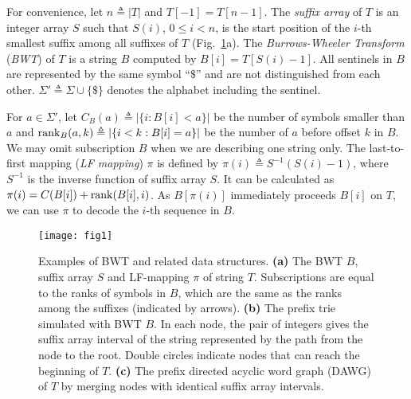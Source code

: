 \documentclass[webpdf,contemporary,large,namedate]{oup-authoring-template}%
\begin{document}
For convenience, let $n\triangleq|T|$ and $T[-1]=T[n-1]$.
The \emph{suffix array} of $T$ is an integer array $S$ such that $S(i)$,
$0\le i<n$, is the start position of the $i$-th smallest suffix among all suffixes of $T$ (Fig.~\ref{fig:1}a).
The \emph{Burrows-Wheeler Transform} (\emph{BWT}) of $T$ is a string $B$ computed by $B[i]=T[S(i)-1]$.
All sentinels in $B$ are represented by the same symbol ``$\$$'' and are not distinguished from each other.
$\Sigma'\triangleq\Sigma\cup\{\$\}$ denotes the alphabet including the sentinel.

For $a\in\Sigma'$, let $C_B(a)\triangleq|\{i:B[i]<a\}|$ be the number of symbols smaller than $a$
and ${\rm rank}_B(a,k)\triangleq|\{i<k:B[i]=a\}|$ be the number of $a$ before offset $k$ in $B$.
We may omit subscription $B$ when we are describing one string only.
The last-to-first mapping (\emph{LF mapping}) $\pi$ is defined by $\pi(i)\triangleq S^{-1}(S(i)-1)$,
where $S^{-1}$ is the inverse function of suffix array $S$.
It can be calculated as $\pi(i)=C(B[i])+{\rm rank}(B[i],i)$.
As $B[\pi(i)]$ immediately proceeds $B[i]$ on $T$, we can use $\pi$ to decode the $i$-th sequence in $B$.

\begin{figure}[bt]
\centering
\texttt{[image: fig1]}
\caption{Examples of BWT and related data structures.
{\bf (a)} The BWT $B$, suffix array $S$ and LF-mapping $\pi$ of string $T$.
Subscriptions are equal to the ranks of symbols in $B$, which are the same as the ranks among the suffixes (indicated by arrows).
{\bf (b)} The prefix trie simulated with BWT $B$.
In each node, the pair of integers gives the suffix array interval of the string represented by the path from the node to the root.
Double circles indicate nodes that can reach the beginning of $T$.
{\bf (c)} The prefix directed acyclic word graph (DAWG) of $T$ by merging nodes with identical suffix array intervals.}\label{fig:1}
\end{figure}

\end{document}
